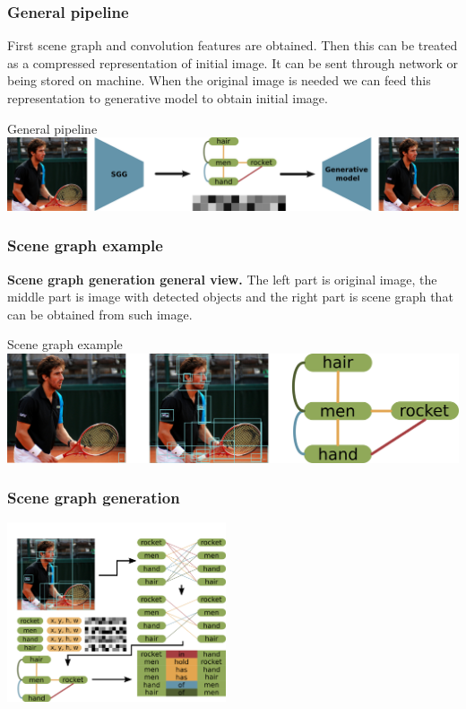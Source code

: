 \documentclass[10pt]{beamer}
\begin{document}
\begin{frame}
    \frametitle{General pipeline}

    First scene graph and convolution features are obtained. Then this can be treated as a compressed representation of initial image. It can be sent through network or being stored on machine. When the original image is needed we can feed this representation to generative model to obtain initial image.

    \begin{block}{General pipeline}
        \includegraphics[width=\textwidth]{figure/application-general-pipeline.png}
    \end{block}
\end{frame}

\begin{frame}
    \frametitle{Scene graph example}

    \textbf{Scene graph generation general view.} The left part is original image, the middle part is image with detected objects and the right part is scene graph that can be obtained from such image.

    \begin{block}{Scene graph example}
        \includegraphics[width=\textwidth]{figure/scene-graph-example.png}
    \end{block}
\end{frame}

\begin{frame}
    \frametitle{Scene graph generation}

    \includegraphics[height=150pt]{figure/sgg-pipeline.png}

\end{frame}
\end{document}
